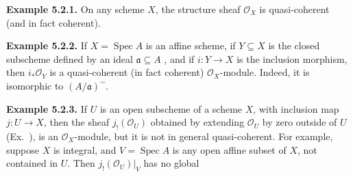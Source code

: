 {\medskip
\noindent\hypertarget{result-II-5.2.1}{}\textbf{Example 5.2.1.} On any scheme $X$, the structure sheaf $\mathcal O_X$ is quasi-coherent (and in fact coherent).

\medskip
\noindent\hypertarget{result-II-5.2.2}{}\textbf{Example 5.2.2.} If $X=\operatorname{Spec}A$ is an affine scheme, if $Y\subseteq X$ is the closed subscheme defined by an ideal $\mathfrak a\subseteq A$ , and if $i\colon Y\to X$ is the inclusion morphism, then $i_*\mathcal O_Y$ is a quasi-coherent (in fact coherent) $\mathcal O_X$-module. Indeed, it is isomorphic to $(A/\mathfrak a)^\sim$.

\medskip
\noindent\hypertarget{result-II-5.2.3}{}\textbf{Example 5.2.3.} If $U$ is an open subscheme of a scheme $X$, with inclusion map $j\colon U\to X$, then the sheaf $j_!(\mathcal O_U)$ obtained by extending $\mathcal O_U$ by zero outside of $U$ (Ex.~), is an $\mathcal O_X$-module, but it is not in general quasi-coherent. For example, suppose $X$ is integral, \EditionText{}and $V=\operatorname{Spec}A$ is any open affine subset of $X$, not contained in $U$. Then $j_!(\mathcal O_U)|_V$ has no global
}
